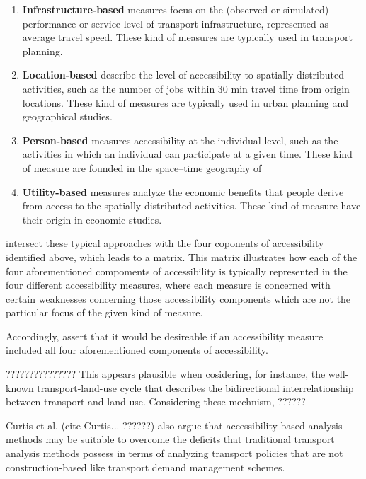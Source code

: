 \begin{enumerate}
	\item \textbf{Infrastructure-based} measures focus on the (observed or simulated) performance or service level of transport infrastructure, \eg represented as average travel speed. These kind of measures are typically used in transport planning.
	
	\item \textbf{Location-based} describe the level of accessibility to spatially distributed activities, such as the number of jobs within 30 min travel time from origin locations. These kind of measures are typically used in urban planning and geographical studies.
	
	\item \textbf{Person-based} measures accessibility at the individual level, such as the activities in which an individual can participate at a given time. These kind of measure are founded in the space–time geography of \citet{Haegerstrand1970}
	
	\item \textbf{Utility-based} measures analyze the economic benefits that people derive from access to the spatially distributed activities. These kind of measure have their origin in economic studies.
\end{enumerate}

\citet{Geurs2004AccessibilityReview} intersect these typical approaches with the four coponents of accessibility identified above, which leads to a matrix. This matrix illustrates how each of the four aforementioned compoments of accessibility is typically represented in the four different accessibility measures, where each measure is concerned with certain weaknesses concerning those accessibility components which are not the particular focus of the given kind of measure.

Accordingly, \citet{Geurs2004AccessibilityReview} assert that it would be desireable if an accessibility measure included all four aforementioned components of accessibility.

???????????????
This appears plausible when cosidering, for instance, the well-known transport-land-use cycle that describes the bidirectional interrelationship between transport and land use. Considering these mechnism, ?????? 

Curtis et al. (cite Curtis... ??????) also argue that accessibility-based analysis methods may be suitable to overcome the deficits that traditional transport analysis methods possess in terms of analyzing transport policies that are not construction-based like transport demand management schemes.

